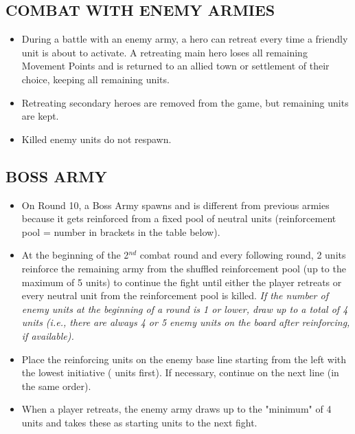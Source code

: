 \subsection*{\MakeUppercase{Combat with Enemy Armies}}

\begin{itemize}
  \item During a battle with an enemy army, a hero can retreat every time a friendly unit is about to activate.
    A retreating main hero loses all remaining Movement Points and is returned to an allied town or settlement of their choice, keeping all remaining units.
  \item Retreating secondary heroes are removed from the game, but remaining units are kept.
  \item Killed enemy units do not respawn.
\end{itemize}

\subsection*{\MakeUppercase{Boss Army}}

\begin{itemize}
  \item On Round 10, a Boss Army spawns and is different from previous armies because it gets reinforced from a fixed pool of neutral units (reinforcement pool = number in brackets in the table below).
  \item At the beginning of the 2$^{nd}$ combat round and every following round, 2 units reinforce the remaining army from the shuffled reinforcement pool (up to the maximum of 5 units) to continue the fight until either the player retreats or every neutral unit from the reinforcement pool is killed. \textit{If the number of enemy units at the beginning of a round is 1 or lower, draw up to a total of 4 units (i.e., there are always 4 or 5 enemy units on the board after reinforcing, if available).}
  \item Place the reinforcing units on the enemy base line starting from the left with the lowest initiative ( units first). If necessary, continue on the next line (in the same order).
  \item When a player retreats, the enemy army draws up to the "minimum" of 4 units and takes these as starting units to the next fight.
\end{itemize}

